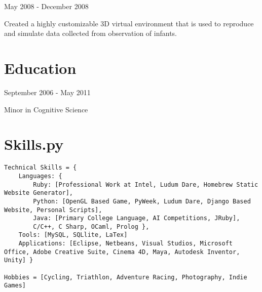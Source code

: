 \documentclass{resume}
\begin{document}
	{May 2008 - December 2008}
\begin{compactitem}
	\item Created a highly customizable 3D virtual environment that is used to reproduce and simulate data collected from observation of infants.
\end{compactitem}

\section{Education}
	{September 2006 - May 2011}

\begin{compactitem}
	\item Minor in Cognitive Science
\end{compactitem}

\section{Skills.py}


\begin{lstlisting}
Technical Skills = { 
	Languages: { 
		Ruby: [Professional Work at Intel, Ludum Dare, Homebrew Static Website Generator],
		Python: [OpenGL Based Game, PyWeek, Ludum Dare, Django Based Website, Personal Scripts],
		Java: [Primary College Language, AI Competitions, JRuby],
		C/C++, C Sharp, OCaml, Prolog },
	Tools: [MySQL, SQLlite, LaTex]
	Applications: [Eclipse, Netbeans, Visual Studios, Microsoft Office, Adobe Creative Suite, Cinema 4D, Maya, Autodesk Inventor, Unity] }

Hobbies = [Cycling, Triathlon, Adventure Racing, Photography, Indie Games]
\end{lstlisting}
	
\end{document}

